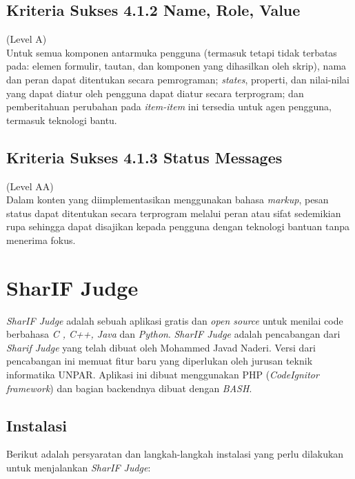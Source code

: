 \subsection{Kriteria Sukses 4.1.2 Name, Role, Value}
\label{subsec:kriteria_4.1.2}
(Level A) \\

Untuk semua komponen antarmuka pengguna (termasuk tetapi tidak terbatas pada: elemen formulir, tautan, dan komponen yang dihasilkan oleh skrip), nama dan peran dapat ditentukan secara pemrograman; \textit{states}, properti, dan nilai-nilai yang dapat diatur oleh pengguna dapat diatur secara terprogram; dan pemberitahuan perubahan pada \textit{item-item} ini tersedia untuk agen pengguna, termasuk teknologi bantu.

\subsection{Kriteria Sukses 4.1.3 Status Messages}
\label{subsec:kriteria_4.1.3}
(Level AA) \\

Dalam konten yang diimplementasikan menggunakan bahasa \textit{markup}, pesan status dapat ditentukan secara terprogram melalui peran atau sifat sedemikian rupa sehingga dapat disajikan kepada pengguna dengan teknologi bantuan tanpa menerima fokus.

\section{SharIF Judge}
\label{sec:SharIF_Judge}
\textit{SharIF Judge} adalah sebuah aplikasi gratis dan \textit{open source} untuk menilai code berbahasa \textit{C , C++, Java} dan \textit{Python}. \textit{SharIF Judge} adalah pencabangan dari \textit{Sharif Judge} yang telah dibuat oleh Mohammed Javad Naderi. Versi dari pencabangan ini memuat fitur baru yang diperlukan oleh jurusan teknik informatika UNPAR. Aplikasi ini dibuat menggunakan PHP (\textit{CodeIgnitor framework}) dan bagian backendnya dibuat dengan \textit{BASH}.

\subsection{Instalasi}
\label{subsec:instalasi}
Berikut adalah persyaratan dan langkah-langkah instalasi yang perlu dilakukan untuk menjalankan \textit{SharIF Judge}:

